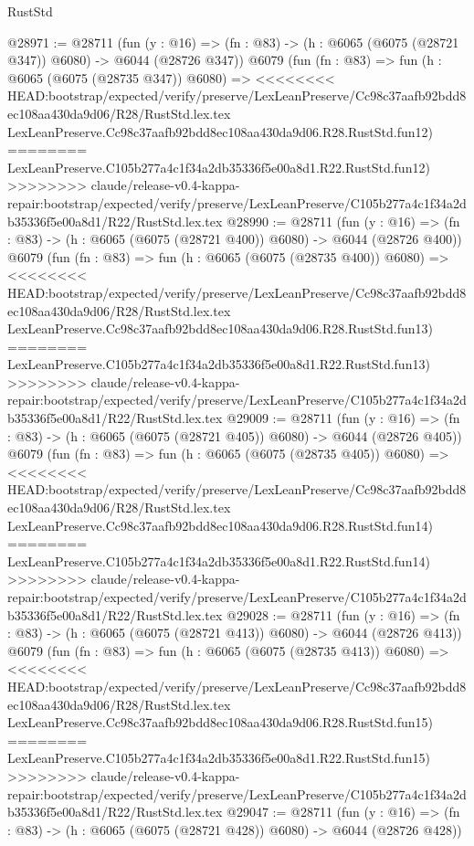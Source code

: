 \begin{lexlean}{RustStd}
\begin{coremodule}
{\begin{coremodule}
{{{{{{{{{{{{{{{{{{{{{{{{{{@28971 := @28711
    (fun (y : @16) => (fn : @83) -> (h : @6065 (@6075 (@28721 @347)) @6080) -> @6044 (@28726 @347))
    @6079
    (fun (fn : @83) =>
    fun (h : @6065 (@6075 (@28735 @347)) @6080) =>
<<<<<<<< HEAD:bootstrap/expected/verify/preserve/LexLeanPreserve/Cc98c37aafb92bdd8ec108aa430da9d06/R28/RustStd.lex.tex
    LexLeanPreserve.Cc98c37aafb92bdd8ec108aa430da9d06.R28.RustStd.fun12)
========
    LexLeanPreserve.C105b277a4c1f34a2db35336f5e00a8d1.R22.RustStd.fun12)
>>>>>>>> claude/release-v0.4-kappa-repair:bootstrap/expected/verify/preserve/LexLeanPreserve/C105b277a4c1f34a2db35336f5e00a8d1/R22/RustStd.lex.tex
@28990 := @28711
    (fun (y : @16) => (fn : @83) -> (h : @6065 (@6075 (@28721 @400)) @6080) -> @6044 (@28726 @400))
    @6079
    (fun (fn : @83) =>
    fun (h : @6065 (@6075 (@28735 @400)) @6080) =>
<<<<<<<< HEAD:bootstrap/expected/verify/preserve/LexLeanPreserve/Cc98c37aafb92bdd8ec108aa430da9d06/R28/RustStd.lex.tex
    LexLeanPreserve.Cc98c37aafb92bdd8ec108aa430da9d06.R28.RustStd.fun13)
========
    LexLeanPreserve.C105b277a4c1f34a2db35336f5e00a8d1.R22.RustStd.fun13)
>>>>>>>> claude/release-v0.4-kappa-repair:bootstrap/expected/verify/preserve/LexLeanPreserve/C105b277a4c1f34a2db35336f5e00a8d1/R22/RustStd.lex.tex
@29009 := @28711
    (fun (y : @16) => (fn : @83) -> (h : @6065 (@6075 (@28721 @405)) @6080) -> @6044 (@28726 @405))
    @6079
    (fun (fn : @83) =>
    fun (h : @6065 (@6075 (@28735 @405)) @6080) =>
<<<<<<<< HEAD:bootstrap/expected/verify/preserve/LexLeanPreserve/Cc98c37aafb92bdd8ec108aa430da9d06/R28/RustStd.lex.tex
    LexLeanPreserve.Cc98c37aafb92bdd8ec108aa430da9d06.R28.RustStd.fun14)
========
    LexLeanPreserve.C105b277a4c1f34a2db35336f5e00a8d1.R22.RustStd.fun14)
>>>>>>>> claude/release-v0.4-kappa-repair:bootstrap/expected/verify/preserve/LexLeanPreserve/C105b277a4c1f34a2db35336f5e00a8d1/R22/RustStd.lex.tex
@29028 := @28711
    (fun (y : @16) => (fn : @83) -> (h : @6065 (@6075 (@28721 @413)) @6080) -> @6044 (@28726 @413))
    @6079
    (fun (fn : @83) =>
    fun (h : @6065 (@6075 (@28735 @413)) @6080) =>
<<<<<<<< HEAD:bootstrap/expected/verify/preserve/LexLeanPreserve/Cc98c37aafb92bdd8ec108aa430da9d06/R28/RustStd.lex.tex
    LexLeanPreserve.Cc98c37aafb92bdd8ec108aa430da9d06.R28.RustStd.fun15)
========
    LexLeanPreserve.C105b277a4c1f34a2db35336f5e00a8d1.R22.RustStd.fun15)
>>>>>>>> claude/release-v0.4-kappa-repair:bootstrap/expected/verify/preserve/LexLeanPreserve/C105b277a4c1f34a2db35336f5e00a8d1/R22/RustStd.lex.tex
@29047 := @28711
    (fun (y : @16) => (fn : @83) -> (h : @6065 (@6075 (@28721 @428)) @6080) -> @6044 (@28726 @428))
}}}}}}}}}}}}}}}}}}}}}}}}}}
\end{coremodule}}
\end{coremodule}
\end{lexlean}
